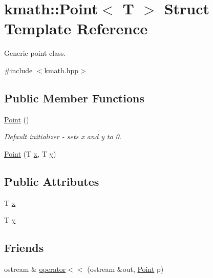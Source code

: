\hypertarget{structkmath_1_1_point_3_01_t_01_4}{\section{kmath\-:\-:Point$<$ T $>$ Struct Template Reference}
\label{structkmath_1_1_point_3_01_t_01_4}
}


Generic point class.  




{\ttfamily \#include $<$kmath.\-hpp$>$}

\subsection*{Public Member Functions}
\begin{DoxyCompactItemize}
\item 
\hyperlink{structkmath_1_1_point_3_01_t_01_4_ac63797a27504bd994b0a5756ffc37428}{Point} ()
\begin{DoxyCompactList}\small\item\em Default initializer -\/ sets {\ttfamily x} and {\ttfamily y} to 0. \end{DoxyCompactList}\item 
\hyperlink{structkmath_1_1_point_3_01_t_01_4_a174f5ab875237f2d5c443fef527e2804}{Point} (T \hyperlink{structkmath_1_1_point_3_01_t_01_4_a367f7e04a97fde0889e5dea495d98acd}{x}, T \hyperlink{structkmath_1_1_point_3_01_t_01_4_a9d69fcd8c019e361cce763e45b8b1698}{y})
\end{DoxyCompactItemize}
\subsection*{Public Attributes}
\begin{DoxyCompactItemize}
\item 
T \hyperlink{structkmath_1_1_point_3_01_t_01_4_a367f7e04a97fde0889e5dea495d98acd}{x}
\item 
T \hyperlink{structkmath_1_1_point_3_01_t_01_4_a9d69fcd8c019e361cce763e45b8b1698}{y}
\end{DoxyCompactItemize}
\subsection*{Friends}
\begin{DoxyCompactItemize}
\item 
ostream \& \hyperlink{structkmath_1_1_point_3_01_t_01_4_ac6ce84350ccb7814a8ebbc3b93fa0fcf}{operator$<$$<$} (ostream \&out, \hyperlink{structkmath_1_1_point_3_01_t_01_4_ac63797a27504bd994b0a5756ffc37428}{Point} p)
\end{DoxyCompactItemize}


